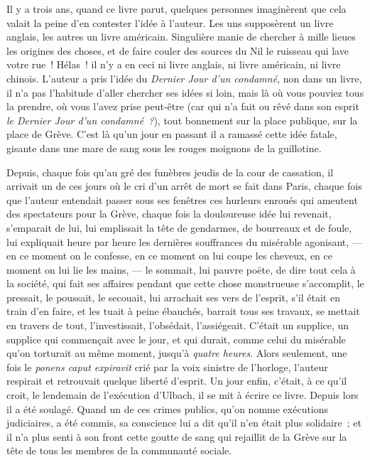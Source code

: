 \documentclass[french,twoside]{book} %
\begin{document}
Il y a trois ans, quand ce livre parut, quelques personnes imaginèrent que cela valait la peine d’en contester l’idée à l’auteur. Les uns supposèrent un livre anglais, les autres un livre américain. Singulière manie de chercher à mille lieues les origines des choses, et de faire couler des sources du Nil le ruisseau qui lave votre rue ! Hélas ! il n’y a en ceci ni livre anglais, ni livre américain, ni livre chinois. L’auteur a pris l’idée du \emph{Dernier Jour d’un condamné}, non dans un livre, il n’a pas l’habitude d’aller chercher ses idées si loin, mais là où vous pouviez tous la prendre, où vous l’avez prise peut-être (car qui n’a fait ou rêvé dans son esprit \emph{le Dernier Jour d’un condamné ?}), tout bonnement sur la place publique, sur la place de Grève.  C’est là qu’un jour en passant il a ramassé cette idée fatale, gisante dans une mare de sang sous les rouges moignons de la guillotine.\par
Depuis, chaque fois qu’au gré des funèbres jeudis de la cour de cassation, il arrivait un de ces jours où le cri d’un arrêt de mort se fait dans Paris, chaque fois que l’auteur entendait passer sous ses fenêtres ces hurleurs enroués qui ameutent des spectateurs pour la Grève, chaque fois la douloureuse idée lui revenait, s’emparait de lui, lui emplissait la tête de gendarmes, de bourreaux et de foule, lui expliquait heure par heure les dernières souffrances du misérable agonisant, — en ce moment on le confesse, en ce moment on lui coupe les cheveux, en ce moment on lui lie les mains, — le sommait, lui pauvre poëte, de dire tout cela à la société, qui fait ses affaires pendant que cette chose monstrueuse s’accomplit, le pressait, le poussait, le secouait, lui arrachait ses vers de l’esprit, s’il était en train d’en faire, et les tuait à peine ébauchés, barrait tous ses travaux, se mettait en travers de tout, l’investissait, l’obsédait, l’assiégeait. C’était un supplice, un supplice qui commençait avec le jour, et qui durait, comme celui du misérable qu’on torturait au même moment, jusqu’à \emph{quatre heures}. Alors seulement, une fois le \emph{ponens caput expiravit} crié par la voix sinistre de l’horloge, l’auteur respirait et retrouvait quelque liberté d’esprit. Un jour enfin, c’était, à ce qu’il croit, le lendemain de l’exécution d’Ulbach, il se mit à écrire ce livre. Depuis lors il a été soulagé. Quand un de ces crimes publics, qu’on nomme exécutions judiciaires, a été commis, sa conscience lui a dit qu’il n’en était plus solidaire ; et il n’a plus senti à son  front cette goutte de sang qui rejaillit de la Grève sur la tête de tous les membres de la communauté sociale.\par
\end{document}
